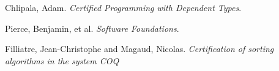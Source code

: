 \documentclass{article}
\begin{document}
\begin{thebibliography}{xx}
    Chlipala, Adam. \emph{Certified Programming with Dependent Types}.

    Pierce, Benjamin, et al. \emph{Software Foundations}.
    
    Filliatre, Jean-Christophe and Magaud, Nicolas. \emph{Certification of sorting algorithms in the system COQ}
\end{thebibliography}
\end{document}
